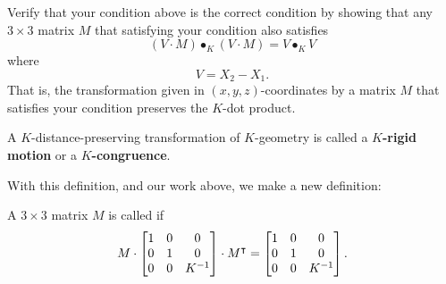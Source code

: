 \documentclass{ximera}
\begin{document}
\begin{problem}
Verify that your condition above is the correct condition by showing
that any $3\times3$ matrix $M$ that satisfying your condition also satisfies%
\[
\left(   V  \cdot M\right)  \bullet_{K}\left(   V
\cdot M\right)  =V\bullet_{K}V
\]
where%
\[
V=X_{2}-X_{1}.
\]
That is, the transformation given in $\left( x,y,z\right)
$-coordinates by a matrix $M$ that satisfies your condition preserves
the $K$-dot product.
\end{problem}





\begin{definition}
A $K$-distance-preserving transformation of $K$-geometry is called a
$K$\textbf{-rigid motion} or a $K$\textbf{-congruence}.
\end{definition}

With this definition, and our work above, we make a new definition:


\begin{definition}
A $3\times3$ matrix $M$ is called  if
\[
M\cdot\begin{bmatrix}
1 & 0 & 0\\
0 & 1 & 0\\
0 & 0 & K^{-1}%
\end{bmatrix}  \cdot M^\transpose=\begin{bmatrix}
1 & 0 & 0\\
0 & 1 & 0\\
0 & 0 & K^{-1}%
\end{bmatrix}.
\]
\end{definition}
\end{document}
